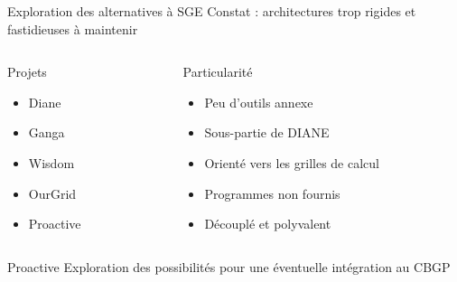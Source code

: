 \documentclass{beamer}
\begin{document}
\begin{frame}{Exploration des alternatives à SGE}
    Constat : architectures trop rigides et fastidieuses à maintenir
	\begin{columns}
	\begin{column}[l]{0.3\linewidth}
    \begin{block}{Projets}
        \begin{itemize}
            \item<2-> Diane
            \item<3-> Ganga
            \item<4-> Wisdom
            \item<5-> OurGrid
            \item<6-> Proactive
        \end{itemize}
    \end{block}
	\end{column}
	\begin{column}[r]{0.6\linewidth}
    \begin{exampleblock}{Particularité}
        \begin{itemize}
            \item<2-> Peu d'outils annexe
            \item<3-> Sous-partie de DIANE
            \item<4-> Orienté vers les grilles de calcul
            \item<5-> Programmes non fournis
            \item<6-> Découplé et polyvalent
        \end{itemize}
    \end{exampleblock}
	\end{column}
	\end{columns}
\end{frame}

\begin{frame}{Proactive}
    Exploration des possibilités pour une éventuelle intégration au CBGP
\end{frame}
\end{document}
